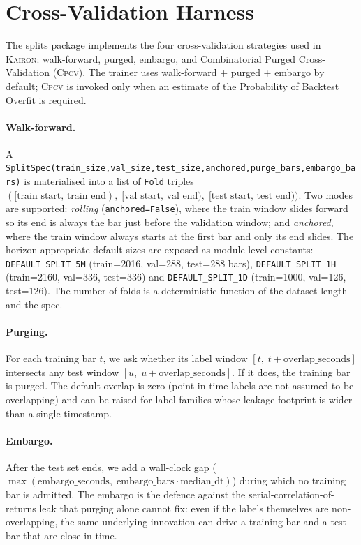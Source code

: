 \documentclass[11pt,a4paper]{article}
\let\oldsection\section
\renewcommand{\section}{\clearpage\oldsection}
\providecommand{\kairon}{\textsc{Kairon}}
\providecommand{\cpcv}{\textsc{Cpcv}}
\begin{document}
\section{Cross-Validation Harness}\label{sec:splits}

The splits package implements the four cross-validation
strategies used in \kairon{}: walk-forward, purged,
embargo, and Combinatorial Purged Cross-Validation
(\cpcv{}). The trainer uses walk-forward + purged + embargo
by default; \cpcv{} is invoked only when an estimate of the
Probability of Backtest Overfit is required.

\paragraph{Walk-forward.}
A \texttt{SplitSpec(train\_size,\;val\_size,\;test\_size,\;anchored,\;purge\_bars,\;embargo\_bars)}
is materialised into a list of \texttt{Fold} triples
\(([\text{train\_start},\,\text{train\_end}),\;[\text{val\_start},\,\text{val\_end}),\;[\text{test\_start},\,\text{test\_end}))\).
Two modes are supported: \emph{rolling}
(\texttt{anchored=False}), where the train window slides forward
so its end is always the bar just before the validation window;
and \emph{anchored}, where the train window always starts at
the first bar and only its end slides. The horizon-appropriate
default sizes are exposed as module-level constants:
\texttt{DEFAULT\_SPLIT\_5M} (train=2016, val=288, test=288
bars), \texttt{DEFAULT\_SPLIT\_1H} (train=2160, val=336,
test=336) and \texttt{DEFAULT\_SPLIT\_1D} (train=1000, val=126,
test=126). The number of folds is a deterministic function of
the dataset length and the spec.

\paragraph{Purging.}
For each training bar $t$, we ask whether its label window
$[t,\;t{+}\text{overlap\_seconds}]$ intersects any test window
$[u,\;u{+}\text{overlap\_seconds}]$. If it does, the training
bar is purged. The default overlap is zero (point-in-time
labels are not assumed to be overlapping) and can be raised
for label families whose leakage footprint is wider than a
single timestamp.

\paragraph{Embargo.}
After the test set ends, we add a wall-clock gap
($\max(\text{embargo\_seconds},\;\text{embargo\_bars}\cdot\text{median\_dt})$)
during which no training bar is admitted. The embargo is the
defence against the serial-correlation-of-returns leak that
purging alone cannot fix: even if the labels themselves are
non-overlapping, the same underlying innovation can drive a
training bar and a test bar that are close in time.
\end{document}
